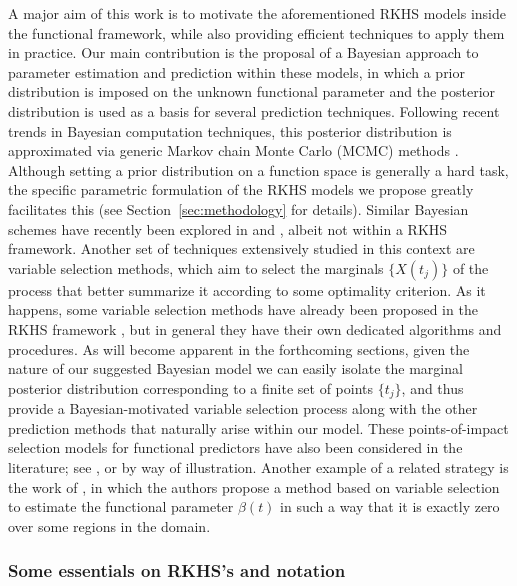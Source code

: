 \documentclass{article}
\numberwithin{equation}{section}
\theoremstyle{plain}
\begin{document}
A major aim of this work is to motivate the aforementioned RKHS models inside the functional framework, while also providing efficient techniques to apply them in practice. Our main contribution is the proposal of a Bayesian approach to parameter estimation and prediction within these models, in which a prior distribution is imposed on the unknown functional parameter and the posterior distribution is used as a basis for several prediction techniques. Following recent trends in Bayesian computation techniques, this posterior distribution is approximated via generic Markov chain Monte Carlo (MCMC) methods \citep[e.g.][]{brooks2011handbook}. Although setting a prior distribution on a function space is generally a hard task, the specific parametric formulation of the RKHS models we propose greatly facilitates this (see Section~\ref{sec:methodology} for details). Similar Bayesian schemes have recently been explored in \citet{grollemund2019bayesian} and \citet{abraham2023informative}, albeit not within a RKHS framework. Another set of techniques extensively studied in this context are variable selection methods, which aim to select the marginals \(\{X(t_j)\}\) of the process that better summarize it according to some optimality criterion. As it happens, some variable selection methods have already been proposed in the RKHS framework \citep[e.g.][]{berrendero2019rkhs, bueno2019variable}, but in general they have their own dedicated algorithms and procedures. As will become apparent in the forthcoming sections, given the nature of our suggested Bayesian model we can easily isolate the marginal posterior distribution corresponding to a finite set of points \(\{t_j\}\), and thus provide a Bayesian-motivated variable selection process along with the other prediction methods that naturally arise within our model. These points-of-impact selection models for functional predictors have also been considered in the  literature; see \citet{ferraty2010most}, \citet{berrendero2016variable} or \citet{poss2020superconsistent} by way of illustration. Another example of a related strategy is the work of \citet{james2009functional}, in which the authors propose a method based on variable selection to estimate the functional parameter \(\beta(t)\) in such a way that it is exactly zero over some regions in the domain.

\subsubsection*{Some essentials on RKHS's and notation}\label{sec:rkhs}
\end{document}
